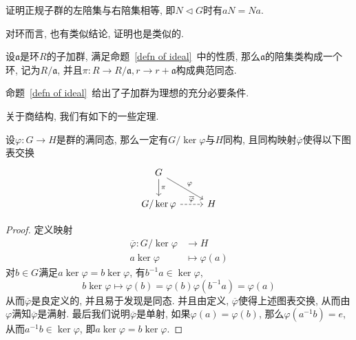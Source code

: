 \begin{ex}
    证明正规子群的左陪集与右陪集相等, 即$N\lhd G$时有$aN=Na$.
\end{ex}

对环而言, 也有类似结论, 证明也是类似的.
\begin{thm}
    设$\mathfrak{a}$是环$R$的子加群, 满足命题~\ref{defn of ideal}~中的性质, 那么$\mathfrak{a}$的陪集类构成一个环, 记为$R/\mathfrak{a}$, 并且$\pi:R\to R/\mathfrak{a},r\to r+\mathfrak{a}$构成典范同态.
\end{thm}

\begin{col}
    命题~\ref{defn of ideal}~给出了子加群为理想的充分必要条件.
\end{col}

关于商结构, 我们有如下的一些定理.

\begin{thm}[第一同构定理]
    设$\varphi:G\to H$是群的满同态, 那么一定有$G/\ker\varphi$与$H$同构, 且同构映射$\overline\varphi$使得以下图表交换
    \[\begin{tikzcd}
        G \ar[d, "\pi"]\ar[dr, "\varphi"] & \\
        G/\ker\varphi \ar[r, dashed, "\overline\varphi"] & H
    \end{tikzcd}\]
\end{thm}
\begin{proof}
    定义映射
    \begin{align*}
        \overline{\varphi}:G/\ker\varphi&\to H\\
        a\ker\varphi&\mapsto\varphi(a)
    \end{align*}
    对$b\in G$满足$a\ker\varphi=b\ker\varphi$, 有$b^{-1}a\in\ker\varphi$,
    \[b\ker\varphi\mapsto\varphi(b)=\varphi(b)\varphi(b^{-1}a)=\varphi(a)\]
    从而$\overline\varphi$是良定义的, 并且易于发现是同态.
    并且由定义, $\overline\varphi$使得上述图表交换, 从而由$\varphi$满知$\overline\varphi$是满射.
    最后我们说明$\overline\varphi$是单射, 如果$\varphi(a)=\varphi(b)$, 那么$\varphi(a^{-1}b)=e$, 从而$a^{-1}b\in\ker\varphi$, 即$a\ker\varphi=b\ker\varphi$.
\end{proof}

